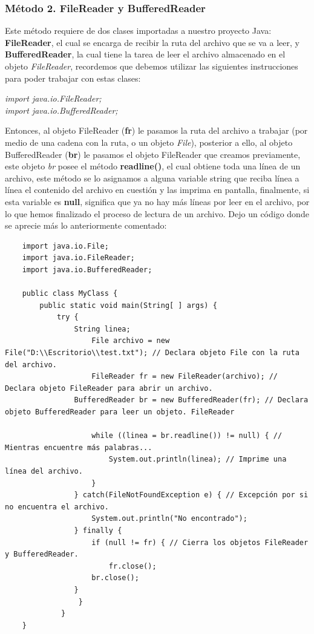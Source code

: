 \subsubsection{Método 2. FileReader y BufferedReader}
\hspace{0.55cm}Este método requiere de dos clases importadas a nuestro proyecto Java: \textbf{FileReader}, el cual se encarga de recibir la ruta del archivo que se va a leer, y \textbf{BufferedReader}, la cual tiene la tarea de leer el archivo almacenado en el objeto \textit{FileReader}, recordemos que debemos utilizar las siguientes instrucciones para poder trabajar con estas clases:
\begin{center}
	\textit{
		import java.io.FileReader; \\
		import java.io.BufferedReader;
	}
\end{center}

Entonces, al objeto FileReader (\textbf{fr}) le pasamos la ruta del archivo a trabajar (por medio de una cadena con la ruta, o un objeto \textit{File}), posterior a ello, al objeto BufferedReader (\textbf{br}) le pasamos el objeto FileReader que creamos previamente, este objeto \textit{br} posee el método \textbf{readline()}, el cual obtiene toda una línea de un archivo, este método se lo asignamos a alguna variable string que reciba línea a línea el contenido del archivo en cuestión y las imprima en pantalla, finalmente, si esta variable es \textbf{null}, significa que ya no hay más líneas por leer en el archivo, por lo que hemos finalizado el proceso de lectura de un archivo. Dejo un código donde se aprecie más lo anteriormente comentado:
\begin{lstlisting}
	import java.io.File;
	import java.io.FileReader;
	import java.io.BufferedReader;

	public class MyClass {
		public static void main(String[ ] args) {
			try {
				String linea;
		    	    File archivo = new File("D:\\Escritorio\\test.txt"); // Declara objeto File con la ruta del archivo.
    			    FileReader fr = new FileReader(archivo); // Declara objeto FileReader para abrir un archivo.
				BufferedReader br = new BufferedReader(fr); // Declara objeto BufferedReader para leer un objeto. FileReader
        
        			while ((linea = br.readline()) != null) { // Mientras encuentre más palabras...
            			System.out.println(linea); // Imprime una línea del archivo.
	        		}
    			} catch(FileNotFoundException e) { // Excepción por si no encuentra el archivo.
        			System.out.println("No encontrado");
	    		} finally {
    		     	if (null != fr) { // Cierra los objetos FileReader y BufferedReader.
         	    		fr.close();
             		br.close();
	           	}
    		     }
	    	 }
	}
\end{lstlisting}


